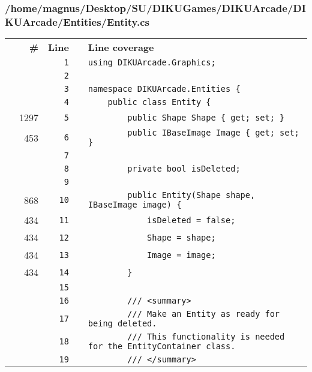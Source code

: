 \documentclass[a4paper,landscape,10pt]{article}
\begin{document}
\subsubsection{/home/magnus/Desktop/SU/DIKUGames/DIKUArcade/DIKUArcade/Entities/Entity.cs}
\begin{longtable}[l]{lrrll}
\textbf{} & \textbf{\#} & \textbf{Line} & \textbf{} & \textbf{Line coverage}\\
\cellcolor{gray} &  & \verb~1~ & & \verb~using DIKUArcade.Graphics;~\\
\cellcolor{gray} &  & \verb~2~ & & \verb~~\\
\cellcolor{gray} &  & \verb~3~ & & \verb~namespace DIKUArcade.Entities {~\\
\cellcolor{gray} &  & \verb~4~ & & \verb~    public class Entity {~\\
\cellcolor{green} & 1297 & \verb~5~ & & \verb~        public Shape Shape { get; set; }~\\
\cellcolor{green} & 453 & \verb~6~ & & \verb~        public IBaseImage Image { get; set; }~\\
\cellcolor{gray} &  & \verb~7~ & & \verb~~\\
\cellcolor{gray} &  & \verb~8~ & & \verb~        private bool isDeleted;~\\
\cellcolor{gray} &  & \verb~9~ & & \verb~~\\
\cellcolor{green} & 868 & \verb~10~ & & \verb~        public Entity(Shape shape, IBaseImage image) {~\\
\cellcolor{green} & 434 & \verb~11~ & & \verb~            isDeleted = false;~\\
\cellcolor{green} & 434 & \verb~12~ & & \verb~            Shape = shape;~\\
\cellcolor{green} & 434 & \verb~13~ & & \verb~            Image = image;~\\
\cellcolor{green} & 434 & \verb~14~ & & \verb~        }~\\
\cellcolor{gray} &  & \verb~15~ & & \verb~~\\
\cellcolor{gray} &  & \verb~16~ & & \verb~        /// <summary>~\\
\cellcolor{gray} &  & \verb~17~ & & \verb~        /// Make an Entity as ready for being deleted.~\\
\cellcolor{gray} &  & \verb~18~ & & \verb~        /// This functionality is needed for the EntityContainer class.~\\
\cellcolor{gray} &  & \verb~19~ & & \verb~        /// </summary>~\\

\end{longtable}
\end{document}
